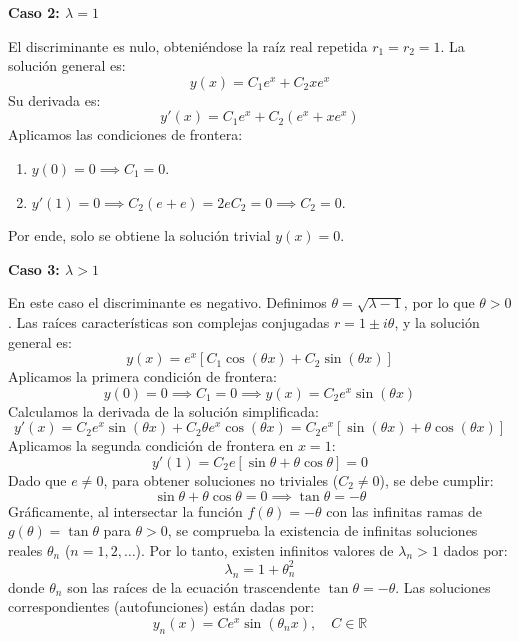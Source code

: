 \documentclass[12pt,letterpaper]{article}
\begin{document}
\medskip
\textbf{Caso 2: $\lambda = 1$}

El discriminante es nulo, obteniéndose la raíz real repetida $r_1 = r_2 = 1$. La solución general es:
\[
  y(x) = C_1 e^x + C_2 x e^x
\]
Su derivada es:
\[
  y'(x) = C_1 e^x + C_2(e^x + x e^x)
\]
Aplicamos las condiciones de frontera:
\begin{enumerate}
  \item $y(0) = 0 \implies C_1 = 0$.
  \item $y'(1) = 0 \implies C_2 (e + e) = 2e C_2 = 0 \implies C_2 = 0$.
\end{enumerate}
Por ende, solo se obtiene la solución trivial $y(x) = 0$.

\medskip
\textbf{Caso 3: $\lambda > 1$}

En este caso el discriminante es negativo. Definimos $\theta = \sqrt{\lambda - 1}$, por lo que $\theta > 0$. Las raíces características son complejas conjugadas $r = 1 \pm i\theta$, y la solución general es:
\[
  y(x) = e^x [ C_1 \cos(\theta x) + C_2 \sin(\theta x) ]
\]
Aplicamos la primera condición de frontera:
\[
  y(0) = 0 \implies C_1 = 0 \implies y(x) = C_2 e^x \sin(\theta x)
\]
Calculamos la derivada de la solución simplificada:
\[
  y'(x) = C_2 e^x \sin(\theta x) + C_2 \theta e^x \cos(\theta x) = C_2 e^x [ \sin(\theta x) + \theta \cos(\theta x) ]
\]
Aplicamos la segunda condición de frontera en $x = 1$:
\[
  y'(1) = C_2 e [ \sin\theta + \theta \cos\theta ] = 0
\]
Dado que $e \neq 0$, para obtener soluciones no triviales ($C_2 \neq 0$), se debe cumplir:
\[
  \sin\theta + \theta \cos\theta = 0 \implies \tan\theta = -\theta
\]
Gráficamente, al intersectar la función $f(\theta) = -\theta$ con las infinitas ramas de $g(\theta) = \tan\theta$ para $\theta > 0$, se comprueba la existencia de infinitas soluciones reales $\theta_n$ ($n = 1, 2, \dots$).
Por lo tanto, existen infinitos valores de $\lambda_n > 1$ dados por:
\[
  \lambda_n = 1 + \theta_n^2
\]
donde $\theta_n$ son las raíces de la ecuación trascendente $\tan\theta = -\theta$.
Las soluciones correspondientes (autofunciones) están dadas por:
\[
  y_n(x) = C e^x \sin(\theta_n x), \quad C \in \mathbb{R}
\]
\end{document}
